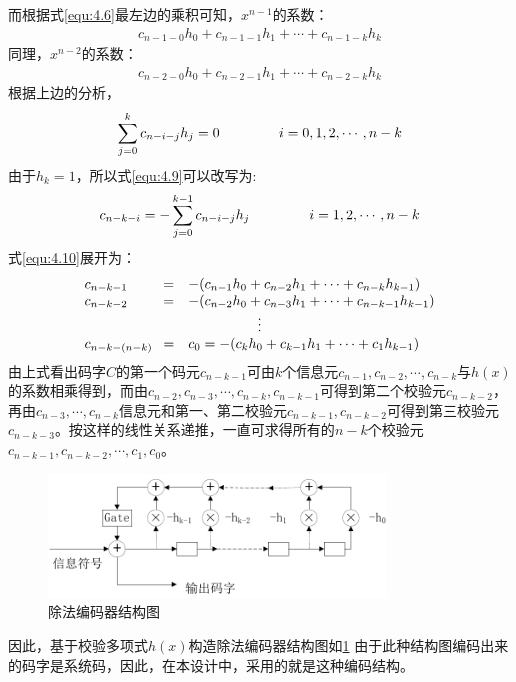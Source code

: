 而根据式\ref{equ:4.6}最左边的乘积可知，$x^{n-1}$的系数：
\begin{eqnarray}
  c_{n-1-0}h_0+c_{n-1-1}h_1+\cdots +c_{n-1-k}h_k
  \label{equ:4.7}
\end{eqnarray}
同理，$x^{n-2}$的系数：
\begin{eqnarray}
  c_{n-2-0}h_0+c_{n-2-1}h_1+\cdots +c_{n-2-k}h_k
  \label{equ:4.8}
\end{eqnarray}
根据上边的分析，
\begin{eqnarray}
  \sum_{j=0}^kc_{n-i-j}h_j=0 \hspace{1.5cm}i=0,1,2,\cdots ,n-k
  \label{equ:4.9}
\end{eqnarray}
由于$h_k=1$，所以式\ref{equ:4.9}可以改写为:
\begin{eqnarray}
  c_{n-k-i}=-\sum_{j=0}^{k-1}c_{n-i-j}h_j \hspace{1.5cm}i=1,2,\cdots ,n-k
  \label{equ:4.10}
\end{eqnarray}
式\ref{equ:4.10}展开为：
\begin{eqnarray}
  \begin{array}{ll}
    c_{n-k-1}\hspace{8mm}=&-(c_{n-1}h_0+c_{n-2}h_1+\cdots +c_{n-k}h_{k-1})\\
    c_{n-k-2}\hspace{8mm}=&-(c_{n-2}h_0+c_{n-3}h_1+\cdots +c_{n-k-1}h_{k-1})\\
    \multicolumn{2}{c}{\vdots}\\
    c_{n-k-(n-k)}~\,=&c_0=-(c_kh_0+c_{k-1}h_1+\cdots +c_1h_{k-1})
  \end{array}
  \label{equ:4.11}
\end{eqnarray}
由上式看出码字$C$的第一个码元$c_{n-k-1}$可由$k$个信息元$c_{n-1},c_{n-2},\cdots
,c_{n-k}$与$h(x)$的系数相乘得到，而由$c_{n-2},c_{n-3},\cdots
,c_{n-k},c_{n-k-1}$可得到第二个校验元$c_{n-k-2}$，再由$c_{n-3},\cdots
,c_{n-k}$信息元和第一、第二校验元$c_{n-k-1},c_{n-k-2}$可得到第三校验元$c_{n-k-3}$。按这样的线性关系递推，一直可求得所有的$n-k$个校验元$c_{n-k-1},c_{n-k-2},\cdots
,c_1,c_0$。
\begin{figure}[htbp]
  \begin{center}
    \includegraphics[width=0.8\textwidth]{images/RS2.pdf}
  \end{center}
  \caption{除法编码器结构图}
  \label{fig:4.2}
\end{figure}
因此，基于校验多项式$h(x)$构造除法编码器结构图如\ref{fig:4.2}
由于此种结构图编码出来的码字是系统码，因此，在本设计中，采用的就是这种编码结构。
